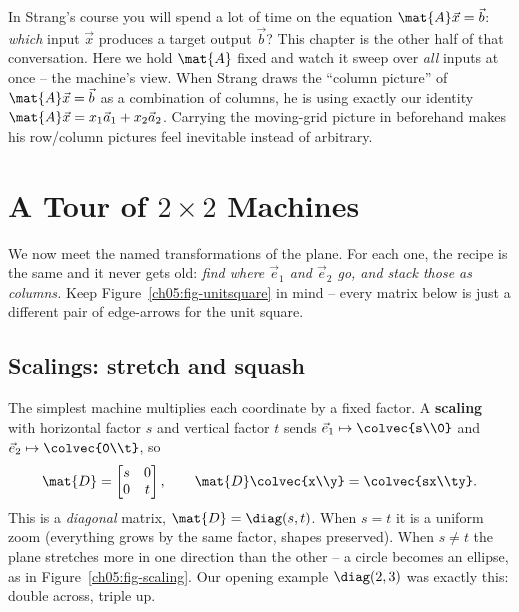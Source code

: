\begin{strangbox}
In Strang's course you will spend a lot of time on the equation
$\mat{A}\vec{x} = \vec{b}$: \emph{which} input $\vec{x}$ produces a target output
$\vec{b}$? This chapter is the other half of that conversation. Here we hold
$\mat{A}$ fixed and watch it sweep over \emph{all} inputs at once -- the machine's
view. When Strang draws the ``column picture'' of $\mat{A}\vec{x} = \vec{b}$ as a
combination of columns, he is using exactly our identity $\mat{A}\vec{x} = x_1
\vec{a}_1 + x_2 \vec{a}_2$. Carrying the moving-grid picture in beforehand makes
his row/column pictures feel inevitable instead of arbitrary.
\end{strangbox}

\section{A Tour of $2\times 2$ Machines}
\label{ch05:tour}

We now meet the named transformations of the plane. For each one, the recipe is
the same and it never gets old: \emph{find where $\vec{e}_1$ and $\vec{e}_2$ go,
and stack those as columns.} Keep Figure~\ref{ch05:fig-unitsquare} in mind --
every matrix below is just a different pair of edge-arrows for the unit square.

\subsection{Scalings: stretch and squash}
\label{ch05:scalings}

The simplest machine multiplies each coordinate by a fixed factor. A
\textbf{scaling} with horizontal factor $s$ and vertical factor $t$ sends
$\vec{e}_1 \mapsto \colvec{s\\0}$ and $\vec{e}_2 \mapsto \colvec{0\\t}$, so
\[
  \mat{D} = \begin{bmatrix} s & 0 \\ 0 & t \end{bmatrix},
  \qquad
  \mat{D}\colvec{x\\y} = \colvec{sx\\ty}.
\]
This is a \emph{diagonal} matrix, $\mat{D} = \diag(s,t)$. When $s = t$ it is a
uniform zoom (everything grows by the same factor, shapes preserved). When
$s \neq t$ the plane stretches more in one direction than the other -- a circle
becomes an ellipse, as in Figure~\ref{ch05:fig-scaling}. Our opening example
$\diag(2,3)$ was exactly this: double across, triple up.


